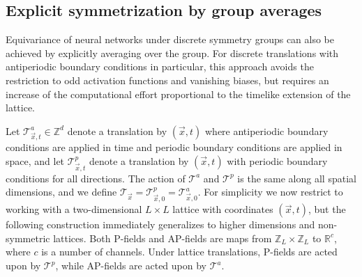 \documentclass[aps,prd,twocolumn,nofootinbib,superscriptaddress,preprintnumbers]{revtex4-1}
\begin{document}
\subsection{Explicit symmetrization by group averages}
\label{app:symmetrization}

Equivariance of neural networks under discrete symmetry groups can also be achieved by explicitly averaging over the group. For discrete translations with antiperiodic boundary conditions in particular, this approach avoids the restriction to odd activation functions and vanishing biases, but requires an increase of the computational effort proportional to the timelike extension of the lattice.

Let $\mathcal{T}^a_{\vec{x},t} \in \mathbb{Z}^d$ denote a translation by $(\vec{x},t)$ where antiperiodic boundary conditions are applied in time and periodic boundary conditions are applied in space, and let $\mathcal{T}^p_{\vec{x},t}$ denote a translation by $(\vec{x},t)$ with periodic boundary conditions for all directions. The action of $\mathcal{T}^a$ and $\mathcal{T}^p$ is the same along all spatial dimensions, and we define $\mathcal{T}_{\vec{x}} = \mathcal{T}^p_{\vec{x}, 0} = \mathcal{T}^a_{\vec{x}, 0}$. For simplicity we now restrict to working with a two-dimensional $L \times L$ lattice with coordinates $(\vec{x},t)$, but the following construction immediately generalizes to higher dimensions and non-symmetric lattices. Both P-fields and AP-fields are maps from $\mathbb{Z}_{L} \times \mathbb{Z}_{L}$ to $\mathbb{R}^c$, where $c$ is a number of channels.
Under lattice translations, P-fields are acted upon by $\mathcal{T}^p$, while AP-fields are acted upon by $\mathcal{T}^a$.
\end{document}

